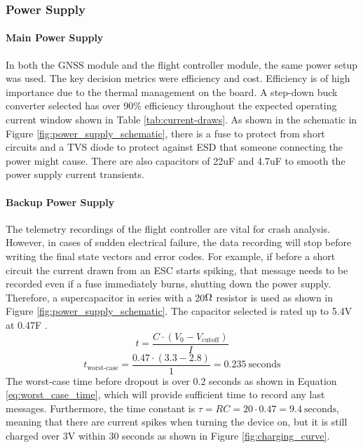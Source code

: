 \subsubsection{Power Supply}\label{sub_sub_section:tgt_power_supply}

\paragraph{Main Power Supply}
In both the GNSS module and the flight controller module, the same power setup was used. The key decision metrics were efficiency and cost.  Efficiency is of high importance due to the thermal management on the board. A step-down buck converter selected has over 90\% efficiency throughout the expected operating current window \cite{ti} shown in Table \ref{tab:current-draws}. As shown in the schematic in Figure \ref{fig:power_supply_schematic}, there is a fuse to protect from short circuits and a \gls{TVS} diode to protect against \gls{ESD} that someone connecting the power might cause. There are also capacitors of 22uF and 4.7uF to smooth the power supply current transients.

\paragraph{Backup Power Supply}
The telemetry recordings of the flight controller are vital for crash analysis. However, in cases of sudden electrical failure, the data recording will stop before writing the final state vectors and error codes. For example, if before a short circuit the current drawn from an \gls{ESC} starts spiking, that message needs to be recorded even if a fuse immediately burns, shutting down the power supply. Therefore, a supercapacitor in series with a 20$\ohm$ resistor is used as shown in Figure \ref{fig:power_supply_schematic}. The capacitor selected is rated up to 5.4V at 0.47F \cite{rs_supercap}. 
\begin{equation}
t = \frac{C \cdot (V_0 - V_{\text{cutoff}})}{I}
\label{eq:discharge_time}
\end{equation}
\begin{equation}
t_{\text{worst-case}} = \frac{0.47 \cdot (3.3 - 2.8)}{1} = 0.235\ \text{seconds}
\label{eq:worst_case_time}
\end{equation}
The worst-case time before dropout is over 0.2 seconds as shown in Equation \ref{eq:worst_case_time}, which will provide sufficient time to record any last messages. Furthermore, the time constant is $\tau = RC = 20 \cdot 0.47 = 9.4\ \text{seconds}$, meaning that there are current spikes when turning the device on, but it is still charged over 3V within 30 seconds as shown in Figure \ref{fig:charging_curve}.

